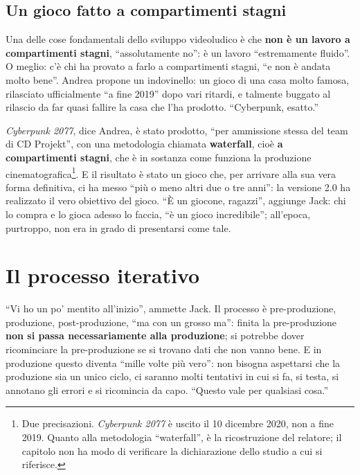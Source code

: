 \subsection{Un gioco fatto a compartimenti stagni}

Una delle cose fondamentali dello sviluppo videoludico è che \textbf{non è
un lavoro a compartimenti stagni}, ``assolutamente no'': è un lavoro
``estremamente fluido''. O meglio: c'è chi ha provato a farlo a compartimenti
stagni, ``e non è andata molto bene''. Andrea propone un indovinello: un
gioco di una casa molto famosa, rilasciato ufficialmente ``a fine 2019''
dopo vari ritardi, e talmente buggato al rilascio da far quasi fallire la
casa che l'ha prodotto. ``Cyberpunk, esatto.''

\emph{Cyberpunk 2077}, dice Andrea, è stato prodotto, ``per ammissione stessa
del team di CD Projekt'', con una metodologia chiamata \textbf{waterfall},
cioè \textbf{a compartimenti stagni}, che è in sostanza come funziona la
produzione cinematografica\footnote{Due precisazioni. \emph{Cyberpunk 2077}
è uscito il 10 dicembre 2020, non a fine 2019. Quanto alla metodologia
``waterfall'', è la ricostruzione del relatore; il capitolo non ha modo di
verificare la dichiarazione dello studio a cui si riferisce.}. E il
risultato è stato un gioco che, per arrivare alla sua vera forma definitiva,
ci ha messo ``più o meno altri due o tre anni'': la versione 2.0 ha
realizzato il vero obiettivo del gioco. ``È un giocone, ragazzi'', aggiunge
Jack: chi lo compra e lo gioca adesso lo faccia, ``è un gioco incredibile'';
all'epoca, purtroppo, non era in grado di presentarsi come tale.

\section{Il processo iterativo}
\label{p2:sec:iterativo}

``Vi ho un po' mentito all'inizio'', ammette Jack. Il processo è
pre-produzione, produzione, post-produzione, ``ma con un grosso ma'':
finita la pre-produzione \textbf{non si passa necessariamente alla
produzione}; si potrebbe dover ricominciare la pre-produzione se si trovano
dati che non vanno bene. E in produzione questo diventa ``mille volte più
vero'': non bisogna aspettarsi che la produzione sia un unico ciclo, ci
saranno molti tentativi in cui si fa, si testa, si annotano gli errori e si
ricomincia da capo. ``Questo vale per qualsiasi cosa.''

